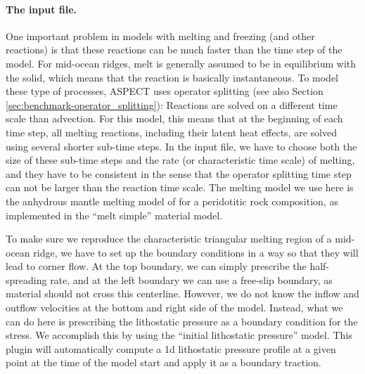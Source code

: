 \documentclass{article}
\newcommand{\aspect}{\textsc{ASPECT}}
\begin{document}
\paragraph{The input file.}
One important problem in models with melting and freezing (and other reactions) is that these reactions 
can be much faster than the time step of the model. For mid-ocean ridges, melt is generally assumed to 
be in equilibrium with the solid, which means that the reaction is basically instantaneous. 
To model these type of processes, \aspect{} uses operator splitting (see also Section \ref{sec:benchmark-operator_splitting}): Reactions are solved on a different time scale than advection. 
For this model, this means that at the beginning of each time step, all melting reactions, 
including their latent heat effects, are solved using several shorter sub-time steps. In the input file, 
we have to choose both the size of these sub-time steps and the rate (or characteristic time scale) of melting, 
and they have to be consistent in the sense that the operator splitting time step can not be larger than 
the reaction time scale. 
The melting model we use here is the anhydrous mantle melting model of \cite{KSL2003} for a peridotitic 
rock composition, as implemented in the ``melt simple'' material model. 



To make sure we reproduce the characteristic triangular melting region of a mid-ocean ridge, we have to  
set up the boundary conditions in a way so that they will lead to corner flow. At the top boundary, we can 
simply prescribe the half-spreading rate, and at the left boundary we can use a free-slip boundary, as 
material should not cross this centerline. However, we do not know the inflow and outflow velocities at 
the bottom and right side of the model. Instead, what we can do here is prescribing the lithostatic 
pressure as a boundary condition for the stress. We accomplish this by using the 
``initial lithostatic pressure'' model. This plugin will automatically compute a 1d lithostatic pressure 
profile at a given point at the time of the model start and apply it as a boundary traction.


\end{document}
